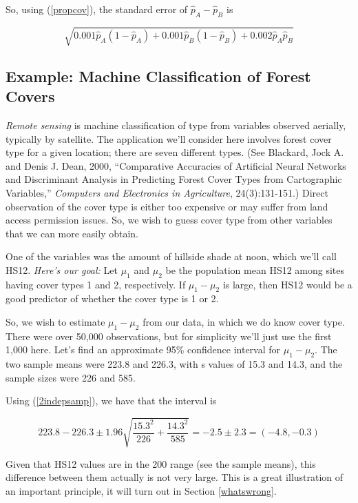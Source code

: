 So, using (\ref{propcov}), the standard error of $\widehat{p}_A -
\widehat{p}_B$ is 

\begin{equation}
\label{seofdiffprops}
\sqrt{
0.001 \widehat{p}_A (1-\widehat{p}_A) +
0.001 \widehat{p}_B (1-\widehat{p}_B)
+0.002 \widehat{p}_A \widehat{p}_B
}
\end{equation}

\subsection{Example:  Machine Classification of Forest Covers}
\label{forestcover}

{\it Remote sensing} is machine classification of type from variables
observed aerially, typically by satellite.  The application we'll
consider here involves forest cover type for a given location; there
are seven different types.  (See Blackard, Jock A. and Denis J. Dean,
2000, ``Comparative Accuracies of Artificial Neural Networks and
Discriminant Analysis in Predicting Forest Cover Types from Cartographic
Variables,'' {\it Computers and Electronics in Agriculture},
24(3):131-151.)  Direct observation of the cover type is either too
expensive or may suffer from land access permission issues.  So, we wish
to guess cover type from other variables that we can more easily obtain.

One of the variables was the amount of hillside shade at noon, which
we'll call HS12.  {\it Here's our goal:}  Let $\mu_1$ and $\mu_2$ be the
population mean HS12 among sites having cover types 1 and 2,
respectively.  If $\mu_1 - \mu_2$ is large, then HS12 would be a good
predictor of whether the cover type is 1 or 2.  

So, we wish to estimate $\mu_1 - \mu_2$ from our data, in which we do
know cover type.  There were over 50,000 observations, but for
simplicity we'll just use the first 1,000 here.  Let's find an
approximate 95\% confidence interval for $\mu_1 - \mu_2$.  The two
sample means were 223.8 and 226.3, with s values of 15.3 and 14.3, and
the sample sizes were 226 and 585.  

Using (\ref{2indepsamp}), we have that the interval is

\begin{equation}
223.8 - 226.3 \pm 1.96 
\sqrt{\frac{15.3^2}{226} + \frac{14.3^2}{585}}
= -2.5 \pm 2.3
= (-4.8,-0.3)
\end{equation}

Given that HS12 values are in the 200 range (see the sample means), this
difference between them actually is not very large.  This is a great
illustration of an important principle, it will turn out in Section
\ref{whatswrong}.

